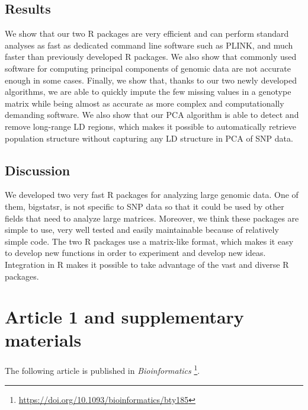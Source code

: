 \subsection{Results}

We show that our two R packages are very efficient and can perform standard analyses as fast as dedicated command line software such as PLINK, and much faster than previously developed R packages.
We also show that commonly used software for computing principal components of genomic data are not accurate enough in some cases.
Finally, we show that, thanks to our two newly developed algorithms, we are able to quickly impute the few missing values in a genotype matrix while being almost as accurate as more complex and computationally demanding software. We also show that our PCA algorithm is able to detect and remove long-range LD regions, which makes it possible to automatically retrieve population structure without capturing any LD structure in PCA of SNP data.

\subsection{Discussion}

We developed two very fast R packages for analyzing large genomic data. One of them, bigstatsr, is not specific to SNP data so that it could be used by other fields that need to analyze large matrices.
Moreover, we think these packages are simple to use, very well tested and easily maintainable because of relatively simple code.
The two R packages use a matrix-like format, which makes it
easy to develop new functions in order to experiment and develop
new ideas. Integration in R makes it possible to take advantage of
the vast and diverse R packages.


\section{Article 1 and supplementary materials}

The following article is published in \textit{Bioinformatics}	\footnote{\url{https://doi.org/10.1093/bioinformatics/bty185}}.



